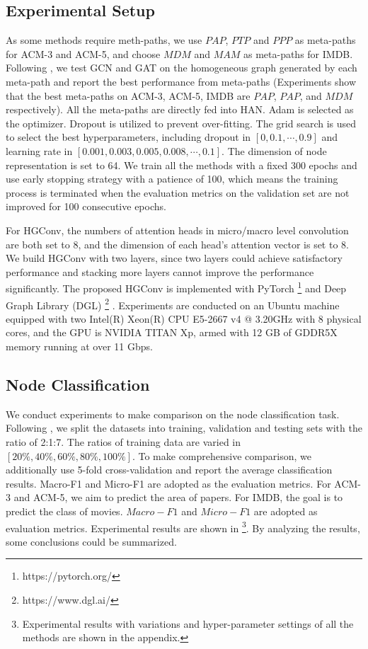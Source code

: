 \subsection{Experimental Setup}
As some methods require meth-paths, we use $PAP$, $PTP$ and $PPP$ as meta-paths for ACM-3 and ACM-5, and choose $MDM$ and $MAM$ as meta-paths for IMDB. Following \citet{DBLP:conf/www/WangJSWYCY19}, we test GCN and GAT on the homogeneous graph generated by each meta-path and report the best performance from meta-paths (Experiments show that the best meta-paths on ACM-3, ACM-5, IMDB are $PAP$, $PAP$, and $MDM$ respectively). All the meta-paths are directly fed into HAN. Adam \cite{kingma2014adam} is selected as the optimizer. Dropout \cite{DBLP:journals/jmlr/SrivastavaHKSS14} is utilized to prevent over-fitting. The grid search is used to select the best hyperparameters, including dropout in $\left[0, 0.1, \cdots, 0.9\right]$ and learning rate in $\left[0.001, 0.003, 0.005, 0.008, \cdots, 0.1\right]$. The dimension of node representation is set to 64. We train all the methods with a fixed 300 epochs and use early stopping strategy with a patience of 100, which means the training process is terminated when the evaluation metrics on the validation set are not improved for 100 consecutive epochs. 

For HGConv, the numbers of attention heads in micro/macro level convolution are both set to 8, and the dimension of each head's attention vector is set to 8. We build HGConv with two layers, since two layers could achieve satisfactory performance and stacking more layers cannot improve the performance significantly. The proposed HGConv is implemented with PyTorch \footnote{https://pytorch.org/} \cite{DBLP:conf/nips/PaszkeGMLBCKLGA19} and Deep Graph Library (DGL) \footnote{https://www.dgl.ai/} \cite{wang2019deep}. Experiments are conducted on an Ubuntu machine equipped with two Intel(R) Xeon(R) CPU E5-2667 v4 @ 3.20GHz with 8 physical cores, and the GPU is NVIDIA TITAN Xp, armed with 12 GB of GDDR5X memory running at over 11 Gbps.

\subsection{Node Classification}
We conduct experiments to make comparison on the node classification task. Following \cite{DBLP:conf/www/WangJSWYCY19}, we split the datasets into training, validation and testing sets with the ratio of 2:1:7. The ratios of training data are varied in $\left[20\%, 40\%, 60\%, 80\%, 100\%\right]$. To make comprehensive comparison, we additionally use 5-fold cross-validation and report the average classification results. Macro-F1 and Micro-F1 are adopted as the evaluation metrics. For ACM-3 and ACM-5, we aim to predict the area of papers. For IMDB, the goal is to predict the class of movies. $Macro-F1$ and $Micro-F1$ are adopted as evaluation metrics. Experimental results are shown in  \footnote{Experimental results with variations and hyper-parameter settings of all the methods are shown in the appendix.}. By analyzing the results, some conclusions could be summarized.

